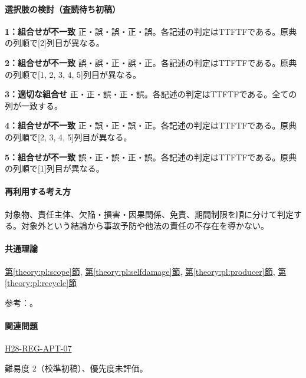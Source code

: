 \paragraph{選択肢の検討（査読待ち初稿）}\mbox{}\par

\noindent\textbf{1：組合せが不一致} 正・誤・誤・正・誤。各記述の判定はTTFTFである。原典の列順で[2]列目が異なる。\par

\noindent\textbf{2：組合せが不一致} 誤・誤・正・誤・正。各記述の判定はTTFTFである。原典の列順で[1, 2, 3, 4, 5]列目が異なる。\par

\noindent\textbf{3：適切な組合せ} 正・正・誤・正・誤。各記述の判定はTTFTFである。全ての列が一致する。\par

\noindent\textbf{4：組合せが不一致} 正・誤・正・誤・正。各記述の判定はTTFTFである。原典の列順で[2, 3, 4, 5]列目が異なる。\par

\noindent\textbf{5：組合せが不一致} 誤・正・誤・正・誤。各記述の判定はTTFTFである。原典の列順で[1]列目が異なる。\par

\paragraph{再利用する考え方} 対象物、責任主体、欠陥・損害・因果関係、免責、期間制限を順に分けて判定する。対象外という結論から事故予防や他法の責任の不存在を導かない。

\paragraph{共通理論} \hyperref[theory:pl:scope]{第\ref*{theory:pl:scope}節}, \hyperref[theory:pl:selfdamage]{第\ref*{theory:pl:selfdamage}節}, \hyperref[theory:pl:producer]{第\ref*{theory:pl:producer}節}, \hyperref[theory:pl:recycle]{第\ref*{theory:pl:recycle}節}

\par 参考：\cite{pl_statute,pl_qa,pl_definitions2018}。

\paragraph{関連問題} \hyperref[q:h28-reg-apt-07]{H28-REG-APT-07}

\par 難易度 2（校準初稿）、優先度未評価。

